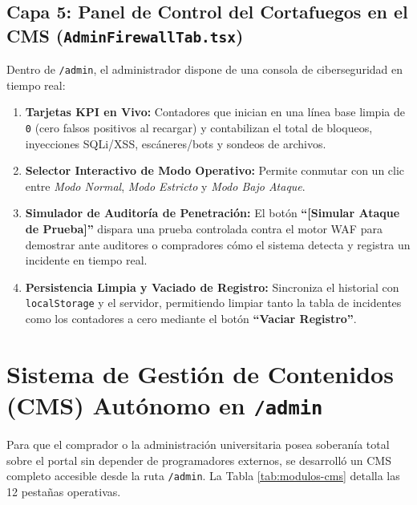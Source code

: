 \documentclass[12pt,a4paper,oneside]{report}
\begin{document}
\section{Capa 5: Panel de Control del Cortafuegos en el CMS (\texttt{AdminFirewallTab.tsx})}
Dentro de \texttt{/admin}, el administrador dispone de una consola de ciberseguridad en tiempo real:
\begin{enumerate}[label=\textbf{\arabic*.}, leftmargin=1.1cm]
  \item \textbf{Tarjetas KPI en Vivo:} Contadores que inician en una línea base limpia de \texttt{0} (cero falsos positivos al recargar) y contabilizan el total de bloqueos, inyecciones SQLi/XSS, escáneres/bots y sondeos de archivos.
  \item \textbf{Selector Interactivo de Modo Operativo:} Permite conmutar con un clic entre \textit{Modo Normal}, \textit{Modo Estricto} y \textit{Modo Bajo Ataque}.
  \item \textbf{Simulador de Auditoría de Penetración:} El botón \textbf{``[Simular Ataque de Prueba]''} dispara una prueba controlada contra el motor WAF para demostrar ante auditores o compradores cómo el sistema detecta y registra un incidente en tiempo real.
  \item \textbf{Persistencia Limpia y Vaciado de Registro:} Sincroniza el historial con \texttt{localStorage} y el servidor, permitiendo limpiar tanto la tabla de incidentes como los contadores a cero mediante el botón \textbf{``Vaciar Registro''}.
\end{enumerate}

\chapter{Sistema de Gestión de Contenidos (CMS) Autónomo en \texttt{/admin}}

Para que el comprador o la administración universitaria posea soberanía total sobre el portal sin depender de programadores externos, se desarrolló un CMS completo accesible desde la ruta \texttt{/admin}. La Tabla \ref{tab:modulos-cms} detalla las 12 pestañas operativas.
\end{document}
